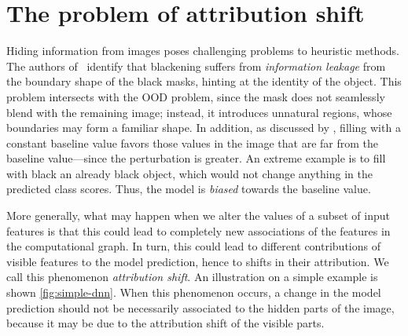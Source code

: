 \section{The problem of attribution shift}
\label{sec:problem}

Hiding information from images poses challenging problems to heuristic methods. The authors of~\citep{rong2022consistent} identify that blackening suffers from \emph{information leakage} from the boundary shape of the black masks, hinting at the identity of the object. This problem intersects with the OOD problem, since the mask does not seamlessly blend with the remaining image; instead, it introduces unnatural regions, whose boundaries may form a familiar shape. In addition, as discussed by \citep{hsieh2021evaluations}, filling with a constant baseline value favors those values in the image that are far from the baseline value---since the perturbation is greater. An extreme example is to fill with black an already black object, which would not change anything in the predicted class scores. Thus, the model is \emph{biased} towards the baseline value. 

More generally, what may happen when we alter the values of a subset of input features is that this could lead to completely new associations of the features in the computational graph. In turn, this could lead to different contributions of visible features to the model prediction, hence to shifts in their attribution. We call this phenomenon \emph{attribution shift}. An illustration on a simple example is shown \autoref{fig:simple-dnn}. When this phenomenon occurs, a change in the model prediction should not be necessarily associated to the hidden parts of the image, because it may be due to the attribution shift of the visible parts.

